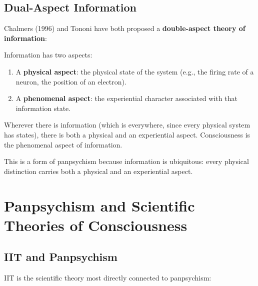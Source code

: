 \documentclass[11pt,a4paper]{report}
\begin{document}
\section{Dual-Aspect Information}

Chalmers (1996) and Tononi have both proposed a \textbf{double-aspect theory of information}:

\begin{principlebox}
Information has two aspects:
\begin{enumerate}[leftmargin=1.5em]
  \item A \textbf{physical aspect}: the physical state of the system (e.g., the firing rate of a neuron, the position of an electron).
  \item A \textbf{phenomenal aspect}: the experiential character associated with that information state.
\end{enumerate}
Wherever there is information (which is everywhere, since every physical system has states), there is both a physical and an experiential aspect. Consciousness is the phenomenal aspect of information.

This is a form of panpsychism because information is ubiquitous: every physical distinction carries both a physical and an experiential aspect.
\end{principlebox}


\chapter{Panpsychism and Scientific Theories of Consciousness}

\section{IIT and Panpsychism}

IIT is the scientific theory most directly connected to panpsychism:
\end{document}
